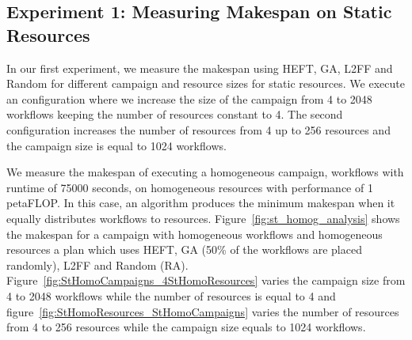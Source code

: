 \subsection{Experiment 1: Measuring Makespan on Static Resources}

In our first experiment, we measure the makespan using HEFT, GA, L2FF and 
Random for different campaign and resource sizes for static resources. We 
execute an configuration where we increase the size of the campaign from 4 to 
2048 workflows keeping the number of resources constant to 4. The second 
configuration increases the number of resources from 4 up to 256 resources and 
the campaign size is equal to 1024 workflows.


We measure the makespan of executing a homogeneous campaign, workflows with 
runtime of 75000 seconds, on homogeneous resources with performance of 1 
petaFLOP. In this case, an algorithm produces the minimum makespan when it 
equally distributes workflows to resources. Figure~\ref{fig:st_homog_analysis} 
shows the makespan for a campaign with homogeneous workflows and homogeneous 
resources a plan which uses HEFT, GA (50\% of the workflows are placed 
randomly), L2FF and Random (RA). 
Figure~\ref{fig:StHomoCampaigns_4StHomoResources} varies the campaign size 
from 4 to 2048 workflows while the number of resources is equal to 4 and 
figure~\ref{fig:StHomoResources_StHomoCampaigns} varies the number of 
resources from 4 to 256 resources while the campaign size equals to 1024 
workflows.

